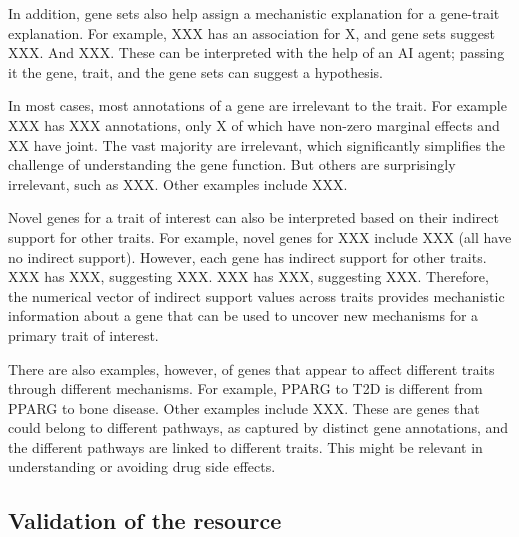 \documentclass[sn-nature,lineno]{sn-jnl}%
\theoremstyle{thmstyleone}%
\theoremstyle{thmstyletwo}%
\theoremstyle{thmstylethree}%
\begin{document}
In addition, gene sets also help assign a mechanistic explanation for a gene-trait explanation. For example, XXX has an association for X, and gene sets suggest XXX. And XXX. These can be interpreted with the help of an AI agent; passing it the gene, trait, and the gene sets can suggest a hypothesis.

In most cases, most annotations of a gene are irrelevant to the trait. For example XXX has XXX annotations, only X of which have non-zero marginal effects and XX have joint. The vast majority are irrelevant, which significantly simplifies the challenge of understanding the gene function. But others are surprisingly irrelevant, such as XXX. Other examples include XXX.

Novel genes for a trait of interest can also be interpreted based on their indirect support for other traits. For example, novel genes for XXX include XXX (all have no indirect support). However, each gene has indirect support for other traits. XXX has XXX, suggesting XXX. XXX has XXX, suggesting XXX. Therefore, the numerical vector of indirect support values across traits provides mechanistic information about a gene that can be used to uncover new mechanisms for a primary trait of interest.

There are also examples, however, of genes that appear to affect different traits through different mechanisms. For example, PPARG to T2D is different from PPARG to bone disease. Other examples include XXX. These are genes that could belong to different pathways, as captured by distinct gene annotations, and the different pathways are linked to different traits. This might be relevant in understanding or avoiding drug side effects.

\subsection{Validation of the resource}


\end{document}
